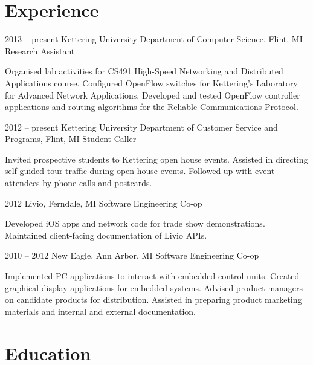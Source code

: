 \documentclass[12pt]{actccv/actccv}
\begin{document}
\maketitle

\section{Experience}

\begin{eventlist}

\item{2013 -- present}
     {Kettering University Department of Computer Science, Flint, MI}
     {Research Assistant}
     
     Organised lab activities for CS491 High-Speed Networking and 
     Distributed Applications course. 
     Configured OpenFlow switches for Kettering's Laboratory for Advanced 
     Network Applications.
     Developed and tested OpenFlow controller applications and routing algorithms 
     for the Reliable Communications Protocol.
     
\item{2012 -- present}
     {Kettering University Department of Customer Service and Programs, Flint, MI}
     {Student Caller}
     
     Invited prospective students to Kettering open house events.
     Assisted in directing self-guided tour traffic during open house events.
     Followed up with event attendees by phone calls and postcards.
     
\item{2012}
     {Livio, Ferndale, MI}
     {Software Engineering Co-op}
     
     Developed iOS apps and network code for trade show demonstrations.
     Maintained client-facing documentation of Livio APIs.
     
\item{2010 -- 2012}
     {New Eagle, Ann Arbor, MI}
     {Software Engineering Co-op}
     
     Implemented PC applications to interact with embedded control units.
     Created graphical display applications for embedded systems.
     Advised product managers on candidate products for distribution.
     Assisted in preparing product marketing materials and internal and 
     external documentation.

\end{eventlist}

\eject
\section{Education}
\end{document}
